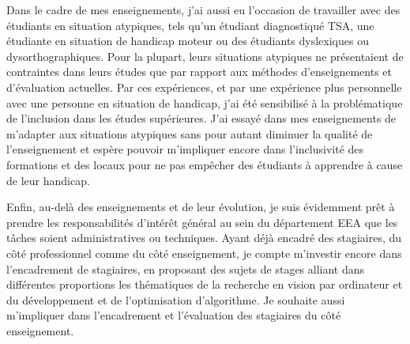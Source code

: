 Dans le cadre de mes enseignements, j'ai aussi eu l'occasion de travailler avec des étudiants en situation atypiques, tels qu'un étudiant diagnostiqué TSA, une étudiante en situation de handicap moteur ou des étudiants dyslexiques ou dysorthographiques. Pour la plupart, leurs situations atypiques ne présentaient de contraintes dans leurs études que par rapport aux méthodes d'enseignements et d'évaluation actuelles. Par ces expériences, et par une expérience plus personnelle avec une personne en situation de handicap, j'ai été sensibilisé à la problématique de l'inclusion dans les études supérieures. J'ai essayé dans mes enseignements de m'adapter aux situations atypiques sans pour autant diminuer la qualité de l'enseignement et espère pouvoir m'impliquer encore dans l'inclusivité des formations et des locaux pour ne pas empêcher des étudiants à apprendre à cause de leur handicap.

Enfin, au-delà des enseignements et de leur évolution, je suis évidemment prêt à prendre les responsabilités d'intérêt général au sein du département EEA que les tâches soient administratives ou techniques. Ayant déjà encadré des stagiaires, du côté professionnel comme du côté enseignement, je compte m'investir encore dans l'encadrement de stagiaires, en proposant des sujets de stages alliant dans différentes proportions les thématiques de la recherche en vision par ordinateur et du développement et de l'optimisation d'algorithme. Je souhaite aussi m'impliquer dans l'encadrement et l'évaluation des stagiaires du côté enseignement.

